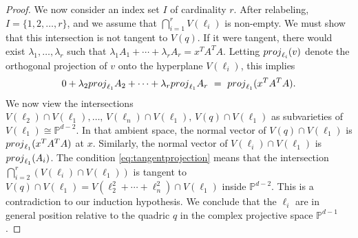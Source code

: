 \documentclass[10pt,a4paper]{amsart}
\newcommand{\PP}{\mathbb{P}}
\begin{document}
\begin{proof}
We now consider an index set $I$ of cardinality $r$. After relabeling, 
$I = \{1,2,\ldots,r\}$, and we assume that  $\bigcap_{i=1}^r V(\ell_i)$  is non-empty.
We must show that this intersection is not  tangent to $V(q)$.
If it were tangent, there would exist $\lambda_1, \ldots, \lambda_r$ such that $\lambda_1 A_1 + \cdots + \lambda_r A_r =  x^TA^TA$.
  Letting ${\rm proj}_{\ell_i}(v)$ denote the orthogonal projection of $v$ onto the hyperplane $V(\ell_i)$, this implies
  \begin{align}\label{eq:tangentprojection}
  0 + \lambda_2 {\rm proj}_{\ell_1}A_2 + \cdots + \lambda_r {\rm proj}_{\ell_1}A_r 
  \,\,=\,\,  {\rm proj}_{\ell_1}(x^TA^TA).
  \end{align}
   We now view the intersections $V(\ell_2) \cap V(\ell_1), \ldots, \,V(\ell_n) \cap V(\ell_1), \,V(q) \cap V(\ell_1)$ as subvarieties of $V(\ell_1) \cong \PP^{d - 2}$.
  In that ambient space, the normal vector of $V(q) \cap V(\ell_1)$ is ${\rm proj}_{\ell_1}(x^TA^TA)$ at $x$.
  Similarly,  the normal vector of $V(\ell_i) \cap V(\ell_1)$ is ${\rm proj}_{\ell_1}(A_i)$.
  The condition  \eqref{eq:tangentprojection} means that the intersection 
  $\bigcap_{i=2}^r(V(\ell_i) \cap V(\ell_1))$  is tangent to 
  $V(q) \cap V(\ell_1) = V(\ell_2^2 + \cdots + \ell_n^2) \cap V(\ell_1)$
  inside $ \PP^{d - 2}$.
  This is a contradiction to our induction hypothesis. We conclude that the $\ell_i$ are in general position relative to the quadric $q$ in the complex projective space $\PP^{d-1}$.
\end{proof}
\end{document}
